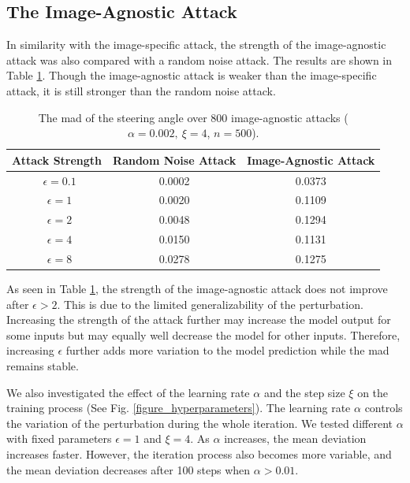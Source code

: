 \vfill

\subsection{The Image-Agnostic Attack}

In similarity with the image-specific attack, the strength of the image-agnostic attack was also compared with a random noise attack.
The results are shown in Table \ref{tab:image-agnostic}. Though the image-agnostic attack is weaker than the image-specific attack, it is still stronger than the random noise attack.

\begin{table}[H]
    \centering
    \begin{tabular}{ccc}
    \hline
    Attack Strength & Random Noise Attack & Image-Agnostic Attack\\
    \hline
    \ $\epsilon=0.1$    & 0.0002    & 0.0373 \\
    \ $\epsilon=1$      & 0.0020    & 0.1109 \\
    \ $\epsilon=2$      & 0.0048    & 0.1294 \\
    \ $\epsilon=4$      & 0.0150    & 0.1131 \\
    \ $\epsilon=8$      & 0.0278    & 0.1275 \\
    \hline
    \end{tabular}
    \caption{The \acrfull{mad} of the steering angle over 800 image-agnostic attacks ($\alpha=0.002,\ \xi=4$, $n=500$).}
    \label{tab:image-agnostic}
\end{table}





As seen in Table \ref{tab:image-agnostic}, the strength of the image-agnostic attack does not improve after $\epsilon > 2$. This is due to the limited generalizability of the perturbation. Increasing the strength of the attack further may increase the model output for some inputs but may equally well decrease the model for other inputs. Therefore, increasing $\epsilon$ further adds more variation to the model prediction while the \acrshort{mad} remains stable.

We also investigated the effect of the learning rate $\alpha$ and the step size $\xi$ on the training process (See Fig. \ref{figure_hyperparameters}). The learning rate $\alpha$ controls the variation of the perturbation during the whole iteration. We tested different $\alpha$ with fixed parameters $\epsilon=1$ and $\xi=4$. As $\alpha$ increases, the mean deviation increases faster. However, the iteration process also becomes more variable, and the mean deviation decreases after 100 steps when $\alpha>0.01$. 

